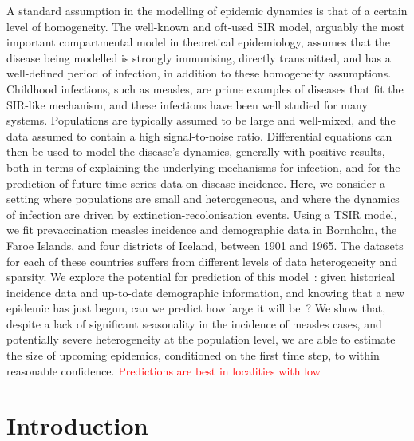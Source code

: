 \documentclass[10pt]{article}
\begin{document}
A standard assumption in the modelling of epidemic dynamics is that of a certain level of homogeneity. The well-known and oft-used SIR model, arguably the most important compartmental model in theoretical epidemiology, assumes that the disease being modelled is strongly immunising, directly transmitted, and has a well-defined period of infection, in addition to these homogeneity assumptions. Childhood infections, such as measles, are prime examples of diseases that fit the SIR-like mechanism, and these infections have been well studied for many systems. Populations are typically assumed to be large and well-mixed, and the data assumed to contain a high signal-to-noise ratio. Differential equations can then be used to model the disease's dynamics, generally with positive results, both in terms of explaining the underlying mechanisms for infection, and for the prediction of future time series data on disease incidence. Here, we consider a setting where populations are small and heterogeneous, and where the dynamics of infection are driven by extinction-recolonisation events. Using a TSIR model, we fit prevaccination measles incidence and demographic data in Bornholm, the Faroe Islands, and four districts of Iceland, between 1901 and 1965. The datasets for each of these countries suffers from different levels of data heterogeneity and sparsity. We explore the potential for prediction of this model~: given historical incidence data and up-to-date demographic information, and knowing that a new epidemic has just begun, can we predict how large it will be~? We show that, despite a lack of significant seasonality in the incidence of measles cases, and potentially severe heterogeneity at the population level, we are able to estimate the size of upcoming epidemics, conditioned on the first time step, to within reasonable confidence. \textcolor{red}{Predictions are best in localities with low}















\section*{Introduction}
\end{document}
